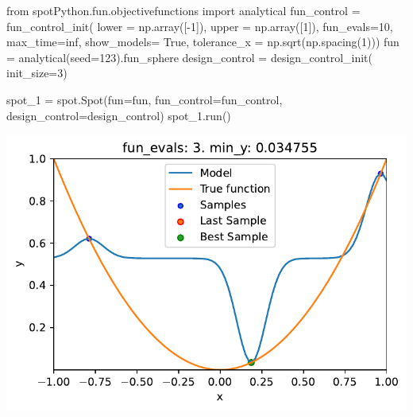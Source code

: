\documentclass[
  letterpaper,
  DIV=11,
  numbers=noendperiod]{scrreprt}
\newenvironment{Shaded}{\begin{snugshade}}{\end{snugshade}}
\newcommand{\DecValTok}[1]{\textcolor[rgb]{0.68,0.00,0.00}{#1}}
\newcommand{\ImportTok}[1]{\textcolor[rgb]{0.00,0.46,0.62}{#1}}
\newcommand{\NormalTok}[1]{\textcolor[rgb]{0.00,0.23,0.31}{#1}}
\newcommand{\OperatorTok}[1]{\textcolor[rgb]{0.37,0.37,0.37}{#1}}
\newcommand{\VariableTok}[1]{\textcolor[rgb]{0.07,0.07,0.07}{#1}}
\begin{document}
\begin{Shaded}
\begin{Highlighting}[]
\ImportTok{from}\NormalTok{ spotPython.fun.objectivefunctions }\ImportTok{import}\NormalTok{ analytical}
\NormalTok{fun\_control }\OperatorTok{=}\NormalTok{ fun\_control\_init(}
\NormalTok{    lower }\OperatorTok{=}\NormalTok{ np.array([}\OperatorTok{{-}}\DecValTok{1}\NormalTok{]),}
\NormalTok{    upper }\OperatorTok{=}\NormalTok{ np.array([}\DecValTok{1}\NormalTok{]),}
\NormalTok{    fun\_evals}\OperatorTok{=}\DecValTok{10}\NormalTok{,}
\NormalTok{    max\_time}\OperatorTok{=}\NormalTok{inf,}
\NormalTok{    show\_models}\OperatorTok{=} \VariableTok{True}\NormalTok{,}
\NormalTok{    tolerance\_x }\OperatorTok{=}\NormalTok{ np.sqrt(np.spacing(}\DecValTok{1}\NormalTok{)))}
\NormalTok{fun }\OperatorTok{=}\NormalTok{ analytical(seed}\OperatorTok{=}\DecValTok{123}\NormalTok{).fun\_sphere}
\NormalTok{design\_control }\OperatorTok{=}\NormalTok{ design\_control\_init(}
\NormalTok{    init\_size}\OperatorTok{=}\DecValTok{3}\NormalTok{)}
\end{Highlighting}
\end{Shaded}

\begin{Shaded}
\begin{Highlighting}[]
\NormalTok{spot\_1 }\OperatorTok{=}\NormalTok{ spot.Spot(fun}\OperatorTok{=}\NormalTok{fun,}
\NormalTok{                    fun\_control}\OperatorTok{=}\NormalTok{fun\_control,}
\NormalTok{                    design\_control}\OperatorTok{=}\NormalTok{design\_control)}
\NormalTok{spot\_1.run()}
\end{Highlighting}
\end{Shaded}

\includegraphics{010_num_spot_sklearn_surrogate_files/figure-pdf/cell-20-output-1.pdf}
\end{document}
